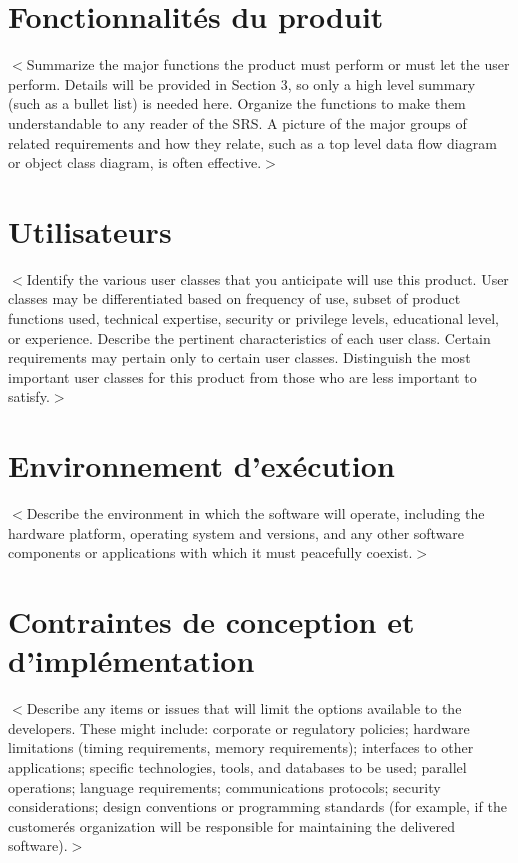 \documentclass{scrreprt}
\begin{document}
\section{Fonctionnalités du produit}
$<$Summarize the major functions the product must perform or must let the user 
perform. Details will be provided in Section 3, so only a high level summary 
(such as a bullet list) is needed here. Organize the functions to make them 
understandable to any reader of the SRS. A picture of the major groups of 
related requirements and how they relate, such as a top level data flow diagram 
or object class diagram, is often effective.$>$

\section{Utilisateurs}
$<$Identify the various user classes that you anticipate will use this product.  
User classes may be differentiated based on frequency of use, subset of product 
functions used, technical expertise, security or privilege levels, educational 
level, or experience. Describe the pertinent characteristics of each user class.  
Certain requirements may pertain only to certain user classes. Distinguish the 
most important user classes for this product from those who are less important 
to satisfy.$>$

\section{Environnement d'exécution}
$<$Describe the environment in which the software will operate, including the 
hardware platform, operating system and versions, and any other software 
components or applications with which it must peacefully coexist.$>$

\section{Contraintes de conception et d'implémentation}
$<$Describe any items or issues that will limit the options available to the 
developers. These might include: corporate or regulatory policies; hardware 
limitations (timing requirements, memory requirements); interfaces to other 
applications; specific technologies, tools, and databases to be used; parallel 
operations; language requirements; communications protocols; security 
considerations; design conventions or programming standards (for example, if the 
customerés organization will be responsible for maintaining the delivered 
software).$>$
\end{document}
